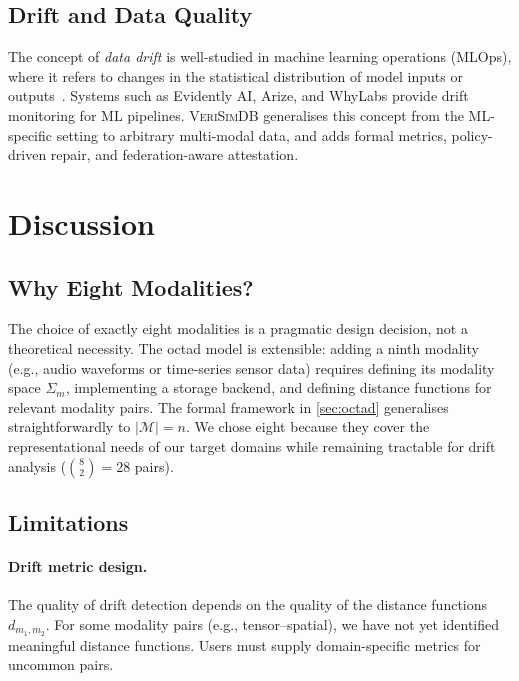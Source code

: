 \documentclass[11pt,twocolumn]{article}
\newcommand{\verisimdb}{\textsc{VeriSimDB}\xspace}
\newcommand{\modset}{\mathcal{M}}
\begin{document}
\subsection{Drift and Data Quality}

The concept of \emph{data drift} is well-studied in machine learning
operations (MLOps), where it refers to changes in the statistical
distribution of model inputs or outputs~\cite{lu2019learning}.  Systems
such as Evidently AI, Arize, and WhyLabs provide drift monitoring for
ML pipelines.  \verisimdb generalises this concept from the ML-specific
setting to arbitrary multi-modal data, and adds formal metrics, policy-driven
repair, and federation-aware attestation.

\section{Discussion}\label{sec:discussion}

\subsection{Why Eight Modalities?}

The choice of exactly eight modalities is a pragmatic design decision, not
a theoretical necessity.  The octad model is extensible: adding a ninth
modality (e.g., audio waveforms or time-series sensor data) requires
defining its modality space $\Sigma_m$, implementing a storage backend,
and defining distance functions for relevant modality pairs.  The formal
framework in \cref{sec:octad} generalises straightforwardly to $|\modset| = n$.
We chose eight because they cover the representational needs of our target
domains while remaining tractable for drift analysis ($\binom{8}{2} = 28$
pairs).

\subsection{Limitations}

\paragraph{Drift metric design.}  The quality of drift detection depends on
the quality of the distance functions $d_{m_1, m_2}$.  For some modality
pairs (e.g., tensor--spatial), we have not yet identified meaningful distance
functions.  Users must supply domain-specific metrics for uncommon pairs.
\end{document}

